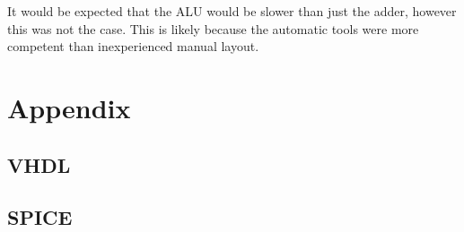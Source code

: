 \documentclass[11pt]{article}
\begin{document}
	It would be expected that the ALU would be slower than just the adder, however this was not the case. This is likely because the automatic tools were more competent than inexperienced manual layout. 

\section{Appendix}

	\subsection{VHDL}
	
		
		
		
		
		
		
		
		
		
		
		
		
		
		
		

	\subsection{SPICE}

		
		
		
\end{document}
